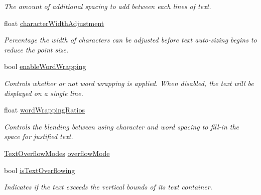 \begin{DoxyCompactItemize}
\begin{DoxyCompactList}\small\item\em The amount of additional spacing to add between each lines of text. \end{DoxyCompactList}\item 
float \mbox{\hyperlink{class_t_m_pro_1_1_t_m_p___text_a14f597328c87f7682183dfd25b0998ba}{character\+Width\+Adjustment}}
\begin{DoxyCompactList}\small\item\em Percentage the width of characters can be adjusted before text auto-\/sizing begins to reduce the point size. \end{DoxyCompactList}\item 
bool \mbox{\hyperlink{class_t_m_pro_1_1_t_m_p___text_a9add0d44e7faabf1070b2ace2ac89378}{enable\+Word\+Wrapping}}
\begin{DoxyCompactList}\small\item\em Controls whether or not word wrapping is applied. When disabled, the text will be displayed on a single line. \end{DoxyCompactList}\item 
float \mbox{\hyperlink{class_t_m_pro_1_1_t_m_p___text_a2b99cf7451acebb062bcdf48f8db8960}{word\+Wrapping\+Ratios}}
\begin{DoxyCompactList}\small\item\em Controls the blending between using character and word spacing to fill-\/in the space for justified text. \end{DoxyCompactList}\item 
\mbox{\hyperlink{namespace_t_m_pro_a7234b7b8868aa9f0174e7db46e272a17}{Text\+Overflow\+Modes}} \mbox{\hyperlink{class_t_m_pro_1_1_t_m_p___text_acd1d576f27eb0362b41e03c5c0ee53e5}{overflow\+Mode}}
\item 
bool \mbox{\hyperlink{class_t_m_pro_1_1_t_m_p___text_ad20ad3119bc80995a2a2ca093b0c1e48}{is\+Text\+Overflowing}}
\begin{DoxyCompactList}\small\item\em Indicates if the text exceeds the vertical bounds of its text container. \end{DoxyCompactList}\item 

\end{DoxyCompactItemize}
